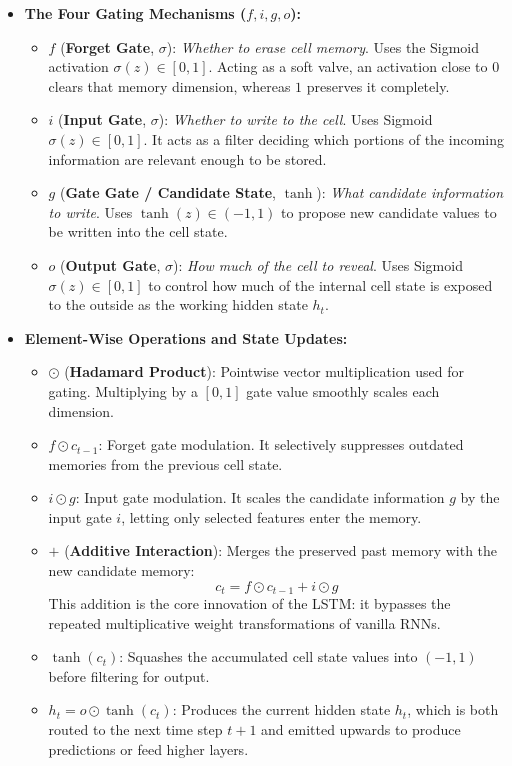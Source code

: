 \begin{itemize}[leftmargin=*]
    \item \textbf{The Four Gating Mechanisms ($f, i, g, o$):}
    \begin{itemize}[leftmargin=1.5em]
        \item $f$ (\textbf{Forget Gate}, $\sigma$): \textit{Whether to erase cell memory}. Uses the Sigmoid activation $\sigma(z) \in [0, 1]$. Acting as a soft valve, an activation close to $0$ clears that memory dimension, whereas $1$ preserves it completely.
        \item $i$ (\textbf{Input Gate}, $\sigma$): \textit{Whether to write to the cell}. Uses Sigmoid $\sigma(z) \in [0, 1]$. It acts as a filter deciding which portions of the incoming information are relevant enough to be stored.
        \item $g$ (\textbf{Gate Gate / Candidate State}, $\tanh$): \textit{What candidate information to write}. Uses $\tanh(z) \in (-1, 1)$ to propose new candidate values to be written into the cell state.
        \item $o$ (\textbf{Output Gate}, $\sigma$): \textit{How much of the cell to reveal}. Uses Sigmoid $\sigma(z) \in [0, 1]$ to control how much of the internal cell state is exposed to the outside as the working hidden state $h_t$.
    \end{itemize}

    \item \textbf{Element-Wise Operations and State Updates:}
    \begin{itemize}[leftmargin=1.5em]
        \item $\odot$ (\textbf{Hadamard Product}): Pointwise vector multiplication used for gating. Multiplying by a $[0, 1]$ gate value smoothly scales each dimension.
        \item $f \odot c_{t-1}$: Forget gate modulation. It selectively suppresses outdated memories from the previous cell state.
        \item $i \odot g$: Input gate modulation. It scales the candidate information $g$ by the input gate $i$, letting only selected features enter the memory.
        \item $+$ (\textbf{Additive Interaction}): Merges the preserved past memory with the new candidate memory:
        \[
        c_t = f \odot c_{t-1} + i \odot g
        \]
        This addition is the core innovation of the LSTM\@: it bypasses the repeated multiplicative weight transformations of vanilla RNNs.
        \item $\tanh(c_t)$: Squashes the accumulated cell state values into $(-1, 1)$ before filtering for output.
        \item $h_t = o \odot \tanh(c_t)$: Produces the current hidden state $h_t$, which is both routed to the next time step $t+1$ and emitted upwards to produce predictions or feed higher layers.
    \end{itemize}
\end{itemize}

